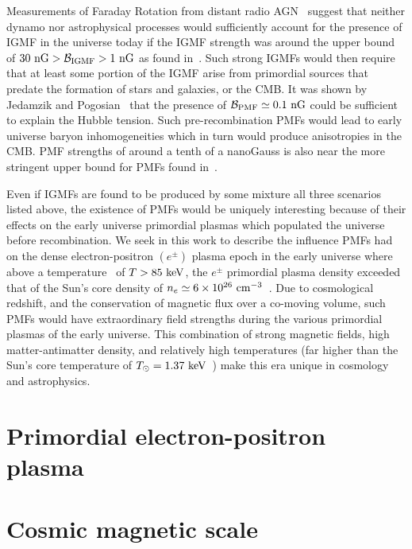 \documentclass[a4paper]{article}
\begin{document}
Measurements of Faraday Rotation from distant radio AGN~\cite{pomakov2022redshift} suggest that neither dynamo nor astrophysical processes would sufficiently account for the presence of IGMF in the universe today if the IGMF strength was around the upper bound of $30{\rm\ nG}>{\cal B}_{\rm IGMF}>1{\rm\ nG}$ as found in~\cite{vernstrom2021discovery}. Such strong IGMFs would then require that at least some portion of the IGMF arise from primordial sources that predate the formation of stars and galaxies, or the CMB. It was shown by Jedamzik and Pogosian~\cite{jedamzik2020relieving} that the presence of ${\cal B}_{\rm PMF}\simeq0.1{\rm\ nG}$ could be sufficient to explain the Hubble tension. Such pre-recombination PMFs would lead to early universe baryon inhomogeneities which in turn would produce anisotropies in the CMB. PMF strengths of around a tenth of a nanoGauss is also near the more stringent upper bound for PMFs found in~\cite{jedamzik2019stringent}.

Even if IGMFs are found to be produced by some mixture all three scenarios listed above, the existence of PMFs would be uniquely interesting because of their effects on the early universe primordial plasmas which populated the universe before recombination. We seek in this work to describe the influence PMFs had on the dense electron-positron $(e^{\pm})$ plasma epoch in the early universe where above a temperature~\cite{rafelski2023short} of $T>85\text{ keV}$, the $e^{\pm}$ primordial plasma density exceeded that of the Sun's core density of $n_{e}\simeq6\times10^{26}{\rm\ cm}^{-3}$~\cite{bahcall2001solar}. Due to cosmological redshift, and the conservation of magnetic flux over a co-moving volume, such PMFs would have extraordinary field strengths during the various primordial plasmas of the early universe. This combination of strong magnetic fields, high matter-antimatter density, and relatively high temperatures (far higher than the Sun's core temperature of $T_{\odot}=1.37\text{ keV}$~\cite{castellani1997solar}) make this era unique in cosmology and astrophysics.

\section{Primordial electron-positron plasma}\label{sec:ElectronPositron}

\section{Cosmic magnetic scale}
\end{document}
